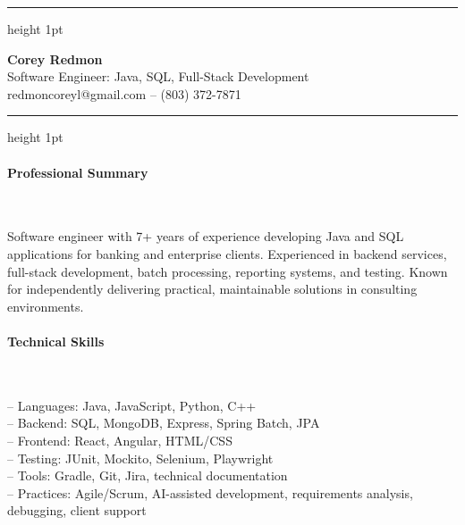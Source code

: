 \documentclass{article}
\begin{document}
	\hrule height 1pt
	\begin{center}
		{\Large \textbf{Corey Redmon}}\\
        Software Engineer: Java, SQL, Full-Stack Development \\
		redmoncoreyl@gmail.com -- (803) 372-7871
	\end{center}
	\vspace{0.1in}
	\hrule height 1pt

	\setlength{\parskip}{0.0in}
	\setlength{\parindent}{0.0in}

	\paragraph{Professional Summary} $ $
    
    Software engineer with 7+ years of experience developing Java and SQL applications for banking and enterprise clients. Experienced in backend services, full-stack development, batch processing, reporting systems, and testing. Known for independently delivering practical, maintainable solutions in consulting environments.

	\paragraph{Technical Skills} $ $

    \setlength{\parindent}{0.2in}
	\hangindent=0.2in
    -- Languages: Java, JavaScript, Python, C++ \\
    -- Backend: SQL, MongoDB, Express, Spring Batch, JPA \\
    -- Frontend: React, Angular, HTML/CSS \\
    -- Testing: JUnit, Mockito, Selenium, Playwright \\
    -- Tools: Gradle, Git, Jira, technical documentation \\
    -- Practices: Agile/Scrum, AI-assisted development, requirements analysis, debugging, client support

\end{document}
